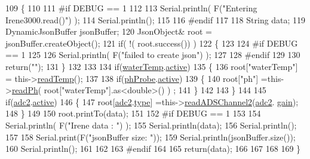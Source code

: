 \begin{DoxyCode}
109 \{
110 
111 \textcolor{preprocessor}{#if DEBUG == 1 }
112     
113     Serial.println( F(\textcolor{stringliteral}{"Entering Irene3000.read()"}) );
114     Serial.println();
115 
116 \textcolor{preprocessor}{#endif }
117 
118     String data;
119     DynamicJsonBuffer jsonBuffer;
120     JsonObject& root = jsonBuffer.createObject();
121     \textcolor{keywordflow}{if}( !( root.success()) )
122     \{
123     
124 \textcolor{preprocessor}{    #if DEBUG == 1 }
125 
126         Serial.println( F(\textcolor{stringliteral}{"failed to create json"}) );
127     
128 \textcolor{preprocessor}{    #endif }
129 
130         \textcolor{keywordflow}{return}(\textcolor{stringliteral}{""});
131     \}
132 
133         
134     \textcolor{keywordflow}{if}(\hyperlink{class_irene3000_af05612c78c758ce9db316c75ad937130}{waterTemp}.\hyperlink{struct_irene3000_1_1state_a879828ace7e7a7bc91ff703bfee36599}{active})
135     \{
136         root[\textcolor{stringliteral}{"waterTemp"}] = this->\hyperlink{class_irene3000_a80bc6dfea106dc3bc54fa20204d4d5dc}{readTemp}();
137 
138         \textcolor{keywordflow}{if}(\hyperlink{class_irene3000_a997a4ee466fa1d5416e07e444965dc9e}{phProbe}.\hyperlink{struct_irene3000_1_1state_a879828ace7e7a7bc91ff703bfee36599}{active})
139         \{
140             root[\textcolor{stringliteral}{"ph"}] =this->\hyperlink{class_irene3000_a436fc0a06681cd0784aba56b9707f19a}{readPh}( root[\textcolor{stringliteral}{"waterTemp"}].as<double>() ) ;
141         \}
142 
143     \}
144 
145     \textcolor{keywordflow}{if}(\hyperlink{class_irene3000_aae3a95a1c83c766cd2f299ce471c337e}{adc2}.\hyperlink{struct_irene3000_1_1state_a879828ace7e7a7bc91ff703bfee36599}{active})
146     \{
147         root[\hyperlink{class_irene3000_aae3a95a1c83c766cd2f299ce471c337e}{adc2}.\hyperlink{struct_irene3000_1_1state_a9897a7e02727db6351d44006eec73799}{type}] =this->\hyperlink{class_irene3000_ae73bd2ed14a199a7e83f4d6458476a7c}{readADSChannel2}(\hyperlink{class_irene3000_aae3a95a1c83c766cd2f299ce471c337e}{adc2}.
      \hyperlink{struct_irene3000_1_1state_a1ecf69d38cb31ecaf6b3602a3f3e93cb}{gain});
148     \}
149     
150     root.printTo(data);
151     
152 \textcolor{preprocessor}{#if DEBUG == 1 }
153 
154     Serial.println( F(\textcolor{stringliteral}{"Irene data : "}) );
155     Serial.println(data);
156     Serial.println();
157 
158     Serial.print(F(\textcolor{stringliteral}{"jsonBuffer size: "}));
159     Serial.println(jsonBuffer.size());
160     Serial.println();
161 
162 
163 \textcolor{preprocessor}{#endif}
164     
165     \textcolor{keywordflow}{return}(data);
166     
167     
168 
169 \}
\end{DoxyCode}
